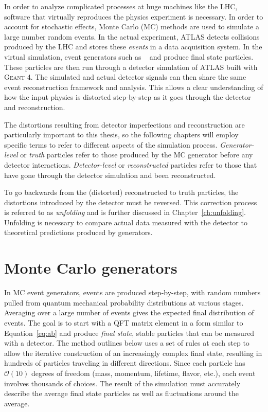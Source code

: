 In order to analyze complicated processes at huge machines like the LHC, software that virtually reproduces the physics experiment is necessary. In order to account for stochastic effects, Monte Carlo (MC) methods are used to simulate a large number random events.  In the actual experiment, ATLAS detects collisions produced by the LHC and stores these \emph{events} in a data acquisition system. In the virtual simulation, event generators such as \hw~\cite{Herwig} and \py\cite{pythia6} produce final state particles. These particles are then run through a detector simulation of ATLAS built with \textsc{Geant 4}\cite{bib:g4}. The simulated and actual detector signals can then share the same event reconstruction framework and analysis. This allows a clear understanding of how the input physics is distorted step-by-step as it goes through the detector and reconstruction. 

The distortions resulting from detector imperfections and reconstruction are particularly important to this thesis, so the following chapters will employ specific terms to refer to different aspects of the simulation process. \emph{Generator-level} or \emph{truth} particles refer to those produced by the MC generator before any detector interactions. \emph{Detector-level} or \emph{reconstructed} particles refer to those that have gone through the detector simulation and been reconstructed. 

To go backwards from the (distorted) reconstructed to truth particles, the distortions introduced by the detector must be reversed. This correction process is referred to as \emph{unfolding} and is further discussed in Chapter~\ref{ch:unfolding}. Unfolding is necessary to compare actual data measured with the detector to theoretical predictions produced by generators.
\section{Monte Carlo generators}
In MC event generators, events are produced step-by-step, with random numbers pulled from quantum mechanical probability distributions at various stages\cite{PDG,Sjostrand:2009ad}.  Averaging over a large number of events gives the expected final distribution of events. The goal is to start with a QFT matrix element in a form similar to Equation~\ref{eq:ab} and produce \emph{final state}, stable particles that can be measured with a detector. The method outlines below uses a set of rules at each step to allow the iterative construction of an increasingly complex final state, resulting in hundreds of particles traveling in different directions. Since each particle has $\mathcal{O}(10)$ degrees of freedom (mass, momentum, lifetime, flavor, etc.), each event involves thousands of choices. The result of the simulation must accurately describe the average final state particles as well as fluctuations around the average. 


